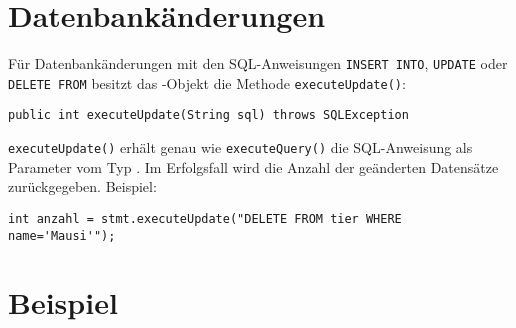\section{Datenbankänderungen}

Für Datenbankänderungen mit den SQL-Anweisungen \lstinline|INSERT INTO|,
\lstinline|UPDATE| oder \lstinline|DELETE FROM| besitzt das
-Objekt die Methode \lstinline|executeUpdate()|:

\begin{lstlisting}
public int executeUpdate(String sql) throws SQLException
\end{lstlisting}

\lstinline|executeUpdate()| erhält genau wie \lstinline|executeQuery()| die
SQL-Anweisung als Parameter vom Typ . Im Erfolgsfall wird die
Anzahl der geänderten Datensätze zurückgegeben. Beispiel:

\begin{lstlisting}
int anzahl = stmt.executeUpdate("DELETE FROM tier WHERE name='Mausi'");
\end{lstlisting}


\section{Beispiel}

